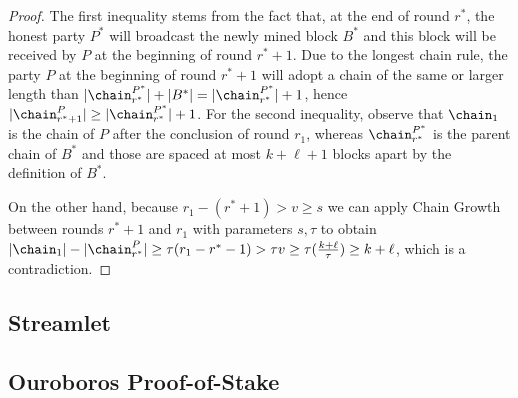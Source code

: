 \begin{proof}
  The first inequality stems from the fact that, at the end of round
  $r^*$, the honest party $P^*$ will broadcast the newly mined block $B^*$
  and this block will be received by $P$ at the beginning of round $r^* + 1$.
  Due to the longest chain rule, the party $P$ at the beginning of round $r^* + 1$ will
  adopt a chain of the same or larger length than
  $|\chain^{P^*}_{r^*}| + |B^*| = |\chain^{P^*}_{r^*}| + 1$,
  hence
  $|\chain^P_{r^* + 1}| \geq |\chain^{P^*}_{r^*}| + 1$.
  For the second inequality, observe that
  $\chain_1$ is the chain of $P$ after the conclusion
  of round $r_1$, whereas $\chain^{P^*}_{r^*}$ is
  the parent chain of $B^*$ and those are spaced at most $k + \ell + 1$ blocks apart by the definition
  of $B^*$.

  On the other hand, because $r_1 - (r^* + 1) > v \geq s$ we can apply Chain Growth
  between rounds $r^* + 1$ and $r_1$
  with parameters
  $s, \tau$ to obtain
  $|\chain_1| - |\chain^P_{r^*}| \geq \tau(r_1 - r^* - 1) > \tau v \geq
  \tau (\frac{k + \ell}{\tau}) \geq k + \ell$,
  which is a contradiction.

  \Qed
\end{proof}

\subsection{Streamlet}


\subsection{Ouroboros Proof-of-Stake}

